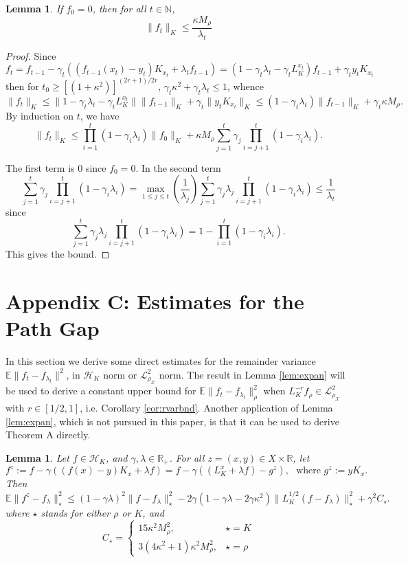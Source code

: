 \documentclass[twoside,11pt]{amsart}
\theoremstyle{theorem}
\newtheorem{lem}[thm]{Lemma}
\theoremstyle{definition}
\theoremstyle{remark}
\def\R{{\mathbb R}}        %
\def\E{{\mathbb E}}        %
\def\L{{\mathscr L}}
\def\L2{{\mathscr L}^2_{\rho_\X}}
\def\M{M_\rho}
\def\H{{\mathscr H}}
\def\X{{\mathscr X}}
\def\N{{\mathbb N}}
\def\t{t_0}
\def\la{\lambda}
\def\ka{\kappa}
\def\ga{\gamma}
\def\st{\star}
\begin{document}
\begin{lem} \label{lem:ftk} If $f_0=0$, then for all $t\in \N$, 
\[ \|f_t\|_K \leq \frac{\ka \M}{\la_t} \]
\end{lem}

\begin{proof}
Since
\[ f_t = f_{t-1} - \ga_t ((f_{t-1}(x_t)-y_t)K_{x_t} + \la_t f_{t-1})=(1 -\ga_t \la_t - \ga_t L_K^{x_t}) f_{t-1} + \ga_t y_t K_{x_t} \]
then for $\t \geq [(1+\ka^2)]^{(2r+1)/2r}$, $\ga_t \ka^2 + \ga_t \la_t \leq 1$, whence
\[ \|f_t \|_K \leq \|1 -\ga_t \la_t - \ga_t L_K^{x_t}\| \|f_{t-1}\|_K + \ga_t \|y_t K_{x_t}\|_K \leq (1-\ga_t \la_t) \|f_{t-1}\|_K + \ga_t \ka \M. \]
By induction on $t$, we have
\[ \|f_t \|_K \leq \prod_{i=1}^t (1-\ga_i \la_i) \|f_0\|_K + \ka \M \sum_{j=1}^t \ga_j \prod_{i=j+1}^t (1 - \ga_i \la_i). \]

The first term is $0$ since $f_0=0$. In the second term
\[\sum_{j=1}^t \ga_j \prod_{i=j+1}^t (1 - \ga_i \la_i ) = \max_{1\leq j\leq t}(\frac{1}{\la_j}) \sum_{j=1}^t \ga_j\la_j  \prod_{i=j+1}^t (1 - \ga_i \la_i )\leq \frac{1}{\la_t} \]
since
$$\sum_{j=1}^t \ga_j\la_j  \prod_{i=j+1}^t (1 - \ga_i \la_i ) = 1 - \prod_{i=1}^t (1 - \ga_i \la_i ). $$
This gives the bound. 
\end{proof}


\section*{Appendix C: Estimates for the Path Gap} 
\renewcommand{\thesection}{C}
\setcounter{equation}{0} \setcounter{thm}{0}
\renewcommand{\thethm}{C.\arabic{thm}}
\renewcommand{\theequation}{C-\arabic{equation}}

In this section we derive some direct estimates for the remainder variance $\E \|f_t - f_{\la_t}\|^2$, in $\H_K$ norm or $\L2$ norm. The result
in Lemma \ref{lem:expan} will be used to derive a constant upper bound for $\E \|f_t - f_{\la_t}\|_\rho^2$ when $L_K^{-r} f_\rho\in \L2$ with $r\in [1/2,1]$,
i.e. Corollary \ref{cor:rvarbnd}. Another application of Lemma \ref{lem:expan}, which is not pursued in this paper, is that it can be used to derive Theorem A directly. 


\begin{lem} \label{lem:pie2}
Let $f\in \H_K$, and $\ga,\la\in \R_+$. For all $z=(x,y)\in X\times \R$, let
\[ f^z:= f - \ga ((f(x)-y)K_x + \la f) = f - \ga ((L_K^x+\la f) - g^z), \ \ \ \mbox{where $g^z:=y K_x$}. \]
Then
\[ \E\|f^z-f_\lambda\|_\st^2 \leq (1 - \ga \la )^2 \|f-f_\la\|_\st^2  - 2 \ga (1 - \ga \la - 2\ga \ka^2) \|L_K^{1/2}(f-f_\la)\|_\st^2 + \ga^2 C_\star . \]
where $\st$ stands for either $\rho$ or $K$, and 
\[C_\st = \left\{\begin{array}{rl}
15 \ka^2 \M^2, & \st = K \\
3 (4\ka^2+1) \ka^2 \M^2 , & \st=\rho
\end{array}
\right.
\]
\end{lem}
\end{document}
